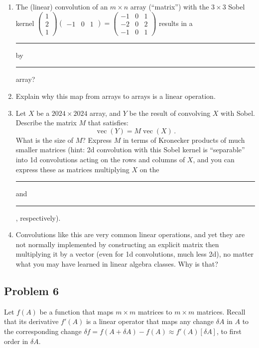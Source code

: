 \documentclass[10pt,oneside]{article}
\newcommand{\vecm}{\operatorname{vec}}
\begin{document}
\begin{enumerate}
\item
The (linear) convolution of an $m \times n$ array (``matrix'') with the $3 \times 3$ Sobel kernel $ \begin{pmatrix} 1 \\ 2 \\ 1 \end{pmatrix} \begin{pmatrix} -1 & 0 & 1 \end{pmatrix} = \begin{pmatrix} -1 & 0 & 1 \\ -2 & 0 & 2 \\ -1 & 0 & 1 \end{pmatrix} $ results in a \rule{1cm}{0.15mm}  by  \rule{1cm}{0.15mm} array?

\item Explain why this map from arrays to arrays is a linear operation.

\item Let $X$ be a $2024 \times 2024$ array, and  $Y$ be the result of convolving $X$ with Sobel.  Describe the matrix $M$ that satisfies:
$$ \vecm(Y) = M \vecm(X) \, .$$ What is the size of $M$?  Express $M$ in terms of Kronecker products of much smaller matrices (hint: 2d convolution with this Sobel kernel is ``separable'' into 1d convolutions acting on the rows and columns of $X$, and you can express these as matrices multiplying $X$ on the \rule{1cm}{0.15mm} and \rule{1cm}{0.15mm}, respectively).

\item Convolutions like this are  very common linear operations, 
and yet they are not normally implemented by constructing an explicit matrix then multiplying it by a vector (even for 1d convolutions, much less 2d),
no matter what you may have learned in linear algebra classes.
Why is that?

\end{enumerate}




 
\subsection*{Problem 6}

Let $f(A)$ be a function that maps $m \times m$ matrices to $m \times m$ matrices.  Recall that its derivative $f'(A)$ is a linear operator that maps any change $\delta A$ in $A$ to the corresponding change $\delta f = f(A+\delta A) - f(A) \approx f'(A)[\delta A]$, to first order in $\delta A$.
\end{document}
